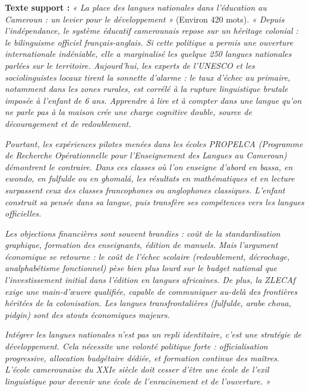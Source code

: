 \documentclass[11pt]{article}
\begin{document}
\begin{exercice}
\textbf{Texte support :} \emph{« La place des langues nationales dans l'éducation au Cameroun : un levier pour le développement »} (Environ 420 mots).
\emph{« Depuis l'indépendance, le système éducatif camerounais repose sur un héritage colonial : le bilinguisme officiel français-anglais. Si cette politique a permis une ouverture internationale indéniable, elle a marginalisé les quelque 250 langues nationales parlées sur le territoire. Aujourd'hui, les experts de l'UNESCO et les sociolinguistes locaux tirent la sonnette d'alarme : le taux d'échec au primaire, notamment dans les zones rurales, est corrélé à la rupture linguistique brutale imposée à l'enfant de 6 ans. Apprendre à lire et à compter dans une langue qu'on ne parle pas à la maison crée une charge cognitive double, source de découragement et de redoublement.}

\emph{Pourtant, les expériences pilotes menées dans les écoles PROPELCA (Programme de Recherche Opérationnelle pour l'Enseignement des Langues au Cameroun) démontrent le contraire. Dans ces classes où l'on enseigne d'abord en bassa, en ewondo, en fulfulde ou en ghomalá, les résultats en mathématiques et en lecture surpassent ceux des classes francophones ou anglophones classiques. L'enfant construit sa pensée dans sa langue, puis transfère ses compétences vers les langues officielles.}

\emph{Les objections financières sont souvent brandies : coût de la standardisation graphique, formation des enseignants, édition de manuels. Mais l'argument économique se retourne : le coût de l'échec scolaire (redoublement, décrochage, analphabétisme fonctionnel) pèse bien plus lourd sur le budget national que l'investissement initial dans l'édition en langues africaines. De plus, la ZLECAf exige une main-d'œuvre qualifiée, capable de communiquer au-delà des frontières héritées de la colonisation. Les langues transfrontalières (fulfulde, arabe choua, pidgin) sont des atouts économiques majeurs.}

\emph{Intégrer les langues nationales n'est pas un repli identitaire, c'est une stratégie de développement. Cela nécessite une volonté politique forte : officialisation progressive, allocation budgétaire dédiée, et formation continue des maîtres. L'école camerounaise du XXIe siècle doit cesser d'être une école de l'exil linguistique pour devenir une école de l'enracinement et de l'ouverture. »}


\end{exercice}
\end{document}
